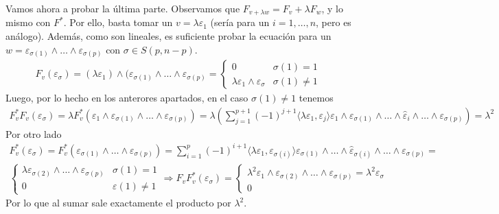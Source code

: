\documentclass[twoside]{article}
\begin{document}
\begin{solucion}
Vamos ahora a probar la última parte. Observamos que $F_{v+\lambda w}=F_v+\lambda F_w$, y lo mismo con $F^*$. Por ello, basta tomar un $v=\lambda\varepsilon_1$ (sería para un $i=1,\dots, n$, pero es análogo). Además, como son lineales, es suficiente probar la ecuación para un $w=\varepsilon_{\sigma(1)}\land\dots\land\varepsilon_{\sigma(p)}$ con $\sigma\in S(p,n-p)$.
\begin{gather*}
F_v(\varepsilon_{\sigma})=(\lambda\varepsilon_1)\land(\varepsilon_{\sigma(1)}\land\dots\land\varepsilon_{\sigma(p)}=\begin{cases}
0 & \sigma(1)=1\\
\lambda\varepsilon_1\land\varepsilon_{\sigma} & \sigma(1)\neq 1
\end{cases}
\end{gather*}
Luego, por lo hecho en los anterores apartados, en el caso $\sigma(1)\neq 1$ tenemos
\begin{gather*}
F^*_vF_v(\varepsilon_{\sigma})=\lambda F^*_v(\varepsilon_1\land\varepsilon_{\sigma(1)}\land\dots\land\varepsilon_{\sigma(p)})=\lambda\left(\sum_{j=1}^{p+1}(-1)^{j+1}\langle\lambda\varepsilon_1,\varepsilon_j\rangle\varepsilon_1\land\varepsilon_{\sigma(1)}\land\dots\land\hat{\varepsilon}_i\land\dots\land\varepsilon_{\sigma(p)}  \right)=\lambda^2
\end{gather*}
Por otro lado 
\begin{gather*}
F^*_v(\varepsilon_{\sigma})=F^*_v(\varepsilon_{\sigma(1)}\land\dots\land\varepsilon_{\sigma(p)})=\sum_{i=1}^p(-1)^{i+1}\langle\lambda\varepsilon_1,\varepsilon_{\sigma(i)}\rangle \varepsilon_{\sigma(1)}\land\dots\land\hat{\varepsilon}_{\sigma(i)}\land\dots\land \varepsilon_{\sigma(p)}=\\
\begin{cases}
\lambda
\varepsilon_{\sigma(2)}\land\dots\land\varepsilon_{\sigma(p)} & \sigma(1)=1\\
0 & \varepsilon(1)\neq 1
\end{cases}\Rightarrow F_vF^*_v(\varepsilon_{\sigma})=\begin{cases}
\lambda^2\varepsilon_1\land\varepsilon_{\sigma(2)}\land\dots\land\varepsilon_{\sigma(p)}=\lambda^2\varepsilon_{\sigma}\\
0
\end{cases}
\end{gather*}
Por lo que al sumar sale exactamente el producto por $\lambda^2$.
\end{solucion}

\newpage
\end{document}
